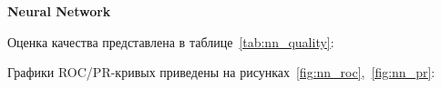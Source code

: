 \vspace{1em}
\textbf{Neural Network}

Оценка качества представлена в таблице~\ref{tab:nn_quality}:

\begin{table}[h]
    \caption{Значения метрик для нейросети}
    \label{tab:nn_quality}
\end{table}

Графики ROC/PR-кривых приведены на рисунках~\ref{fig:nn_roc},~\ref{fig:nn_pr}:

